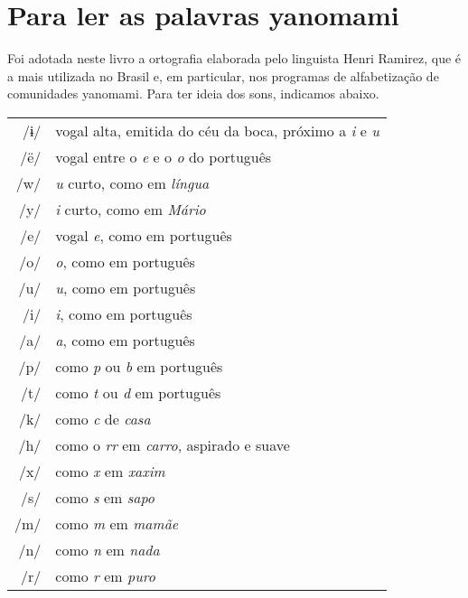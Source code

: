 \chapter{Para ler as palavras yanomami}

Foi adotada neste livro a ortografia elaborada pelo linguista Henri Ramirez, que é a mais utilizada no Brasil e, em particular, nos programas de alfabetização de comunidades yanomami. Para ter ideia dos sons, indicamos abaixo.

\bigskip

\begingroup%
\begin{tabular}{rl}
/ɨ/ & vogal alta, emitida do céu da boca, próximo a \textit{i} e \textit{u}\\
/ë/ & vogal entre o \textit{e} e o \textit{o} do português\\
/w/ & \textit{u} curto, como em \textit{língua}\\
/y/ & \textit{i} curto, como em \textit{Mário}\\
/e/ & vogal \textit{e}, como em português\\
/o/ & \textit{o}, como em português\\
/u/ & \textit{u}, como em português\\
/i/ & \textit{i}, como em português\\
/a/ & \textit{a}, como em português\\
/p/ & como \textit{p} ou \textit{b} em português\\
/t/ & como \textit{t} ou \textit{d} em português\\
/k/ & como \textit{c} de \textit{casa}\\
/h/ & como o \textit{rr} em \textit{carro}, aspirado e suave\\
/x/ & como \textit{x} em \textit{xaxim}\\
/s/ & como \textit{s} em \textit{sapo}\\
/m/ & como \textit{m} em \textit{mamãe}\\
/n/ & como \textit{n} em \textit{nada}\\
/r/ & como \textit{r} em \textit{puro}\\
\end{tabular}
\endgroup